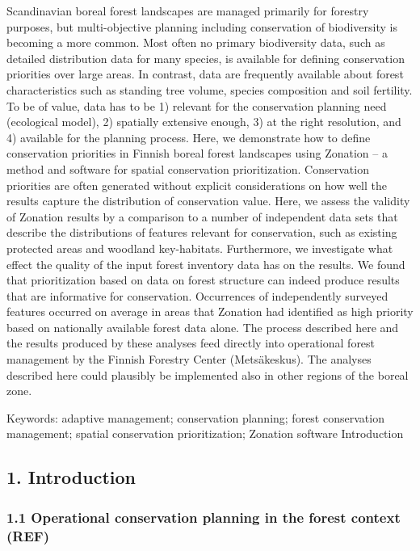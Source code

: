 \documentclass[]{article}
\begin{document}
Scandinavian boreal forest landscapes are managed primarily for forestry
purposes, but multi-objective planning including conservation of
biodiversity is becoming a more common. Most often no primary
biodiversity data, such as detailed distribution data for many species,
is available for defining conservation priorities over large areas. In
contrast, data are frequently available about forest characteristics
such as standing tree volume, species composition and soil fertility. To
be of value, data has to be 1) relevant for the conservation planning
need (ecological model), 2) spatially extensive enough, 3) at the right
resolution, and 4) available for the planning process. Here, we
demonstrate how to define conservation priorities in Finnish boreal
forest landscapes using Zonation -- a method and software for spatial
conservation prioritization. Conservation priorities are often generated
without explicit considerations on how well the results capture the
distribution of conservation value. Here, we assess the validity of
Zonation results by a comparison to a number of independent data sets
that describe the distributions of features relevant for conservation,
such as existing protected areas and woodland key-habitats. Furthermore,
we investigate what effect the quality of the input forest inventory
data has on the results. We found that prioritization based on data on
forest structure can indeed produce results that are informative for
conservation. Occurrences of independently surveyed features occurred on
average in areas that Zonation had identified as high priority based on
nationally available forest data alone. The process described here and
the results produced by these analyses feed directly into operational
forest management by the Finnish Forestry Center (Metsäkeskus). The
analyses described here could plausibly be implemented also in other
regions of the boreal zone.

Keywords: adaptive management; conservation planning; forest
conservation management; spatial conservation prioritization; Zonation
software Introduction

\subsection{1. Introduction}

\subsubsection{1.1 Operational conservation planning in the forest
context (REF)}
\end{document}
